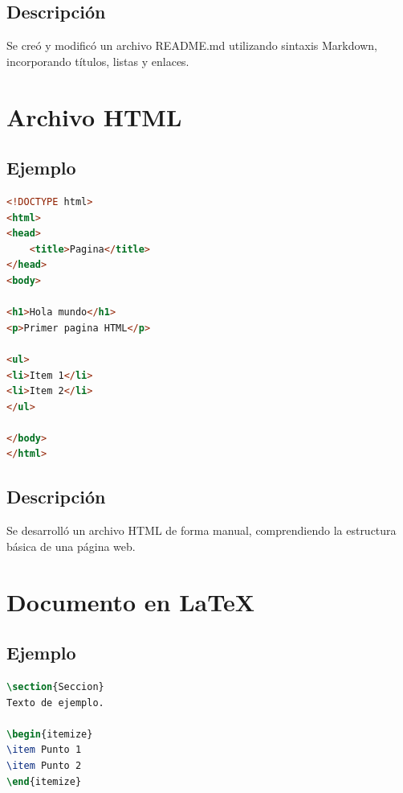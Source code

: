 \documentclass[runningheads]{llncs}
\begin{document}
\subsection{Descripción}

Se creó y modificó un archivo README.md utilizando sintaxis Markdown, incorporando títulos, listas y enlaces.

\section{Archivo HTML}

\subsection{Ejemplo}
\begin{lstlisting}[language=HTML, caption=Ejemplo HTML]
<!DOCTYPE html>
<html>
<head>
    <title>Pagina</title>
</head>
<body>

<h1>Hola mundo</h1>
<p>Primer pagina HTML</p>

<ul>
<li>Item 1</li>
<li>Item 2</li>
</ul>

</body>
</html>
\end{lstlisting}

\subsection{Descripción}

Se desarrolló un archivo HTML de forma manual, comprendiendo la estructura básica de una página web.

\section{Documento en LaTeX}

\subsection{Ejemplo}
\begin{lstlisting}[language=TeX, caption=Ejemplo LaTeX]
\section{Seccion}
Texto de ejemplo.

\begin{itemize}
\item Punto 1
\item Punto 2
\end{itemize}
\end{lstlisting}
\end{document}
